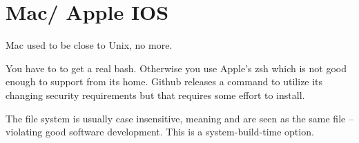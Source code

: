\section{Mac/ Apple IOS}

Mac used to be close to Unix, no more.

You have to  to get a real bash. Otherwise you
use Apple's zsh which is not good enough to support  from its
home. Github releases a  command to utilize its changing
security requirements but that requires some effort to install.

The file system is usually case insensitive, meaning  and
 are seen as the same file -- violating good software 
development. This is a system-build-time option.
